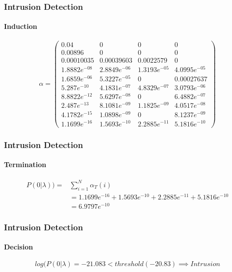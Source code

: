 \documentclass{beamer}
\begin{document}
\begin{frame}
  \frametitle{Intrusion Detection}
  \framesubtitle{Induction}
  $$
  \alpha = 
  \begin{pmatrix} 
    0.04 & 0 & 0 & 0\\
    0.00896 & 0 & 0 & 0\\
    0.00010035 & 0.00039603 & 0.0022579 & 0\\
    1.8882e^{-08} & 2.8849e^{-06} & 1.3193e^{-05} & 4.0995e^{-05}\\
    1.6859e^{-06} & 5.3227e^{-05} & 0& 0.00027637\\
    5.287e^{-10} & 4.1831e^{-07} & 4.8329e^{-07} & 3.0793e^{-06}\\
    8.8822e^{-12} & 5.6297e^{-08}& 0 & 6.4882e^{-07} \\
    2.487e^{-13} & 8.1081e^{-09} & 1.1825e^{-09} & 4.0517e^{-08}\\
    4.1782e^{-15} & 1.0898e^{-09} & 0& 8.1237e^{-09}\\
    1.1699e^{-16} & 1.5693e^{-10} & 2.2885e^{-11} & 5.1816e^{-10}
  \end{pmatrix}
  $$
\end{frame}
\begin{frame}
  \frametitle{Intrusion Detection}
  \framesubtitle{Termination}
  $$
  \begin{array}{ll}
    P(0|\lambda)) = &\sum\limits_{i=1}^N \alpha_T(i) \\
                   & = 1.1699e^{-16} + 1.5693e^{-10} + 2.2885e^{-11} + 5.1816e^{-10} \\
                   &= 6.9797e^{-10}
  \end{array}
$$
\end{frame}
\begin{frame}
  \frametitle{Intrusion Detection}
  \framesubtitle{Decision}
  $$
  log(P(0|\lambda) = -21.083 < threshold (-20.83) \implies Intrusion
  $$
\end{frame}
\end{document}
